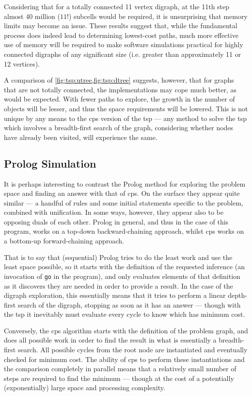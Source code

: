Considering that for a totally connected 11 vertex digraph, at the 11th step almost 40 million (\(11!\)) subcells would be required, it is unsurprising that memory limits may become an issue.  These results suggest that, while the fundamental process does indeed lead to determining lowest-cost paths, much more effective use of memory will be required to make software simulations practical for highly connected digraphs of any significant size (i.e. greater than approximately 11 or 12 vertices).

A comparison of \cref{fig:tsp:utree,fig:tsp:dtree} suggests, however, that for graphs that are not totally connected, the implementations may cope much better, as would be expected.  With fewer paths to explore, the growth in the number of objects will be lesser, and thus the space requirements will be lowered.  This is not unique by any means to the \gls{cps} version of the \gls{tsp} --- any method to solve the \gls{tsp} which involves a breadth-first search of the graph, considering whether nodes have already been visited, will experience the same. 

\subsection{Prolog Simulation}

It is perhaps interesting to contrast the Prolog method for exploring the problem space and finding an answer with that of \gls{cps}.  On the surface they appear quite similar --- a handful of rules and some initial statements specific to the problem, combined with unification.   In some ways, however, they appear also to be opposing duals of each other.  Prolog in general, and thus in the case of this program, works on a top-down backward-chaining approach, whilst \gls{cps} works on a bottom-up forward-chaining approach.

That is to say that (sequential) Prolog tries to do the least work and use the least space possible, so it starts with the definition of the requested inference (an invocation of \texttt{go} in the program), and only evaluates elements of that definition as it discovers they are needed in order to provide a result.  In the case of the digraph exploration, this essentially means that it tries to perform a linear depth-first search of the digraph, stopping as soon as it has an answer --- though with the \gls{tsp} it inevitably must evaluate every cycle to know which has minimum cost.

Conversely, the \gls{cps} algorithm starts with the definition of the problem graph, and does all possible work in order to find the result in what is essentially a breadth-first search.  All possible cycles from the root node are instantiated and eventually checked for minimum cost. The ability of \gls{cps} to perform these instantiations and the comparison completely in parallel means that a relatively small number of steps are required to find the minimum --- though at the cost of a potentially (exponentially) large space and processing complexity.

